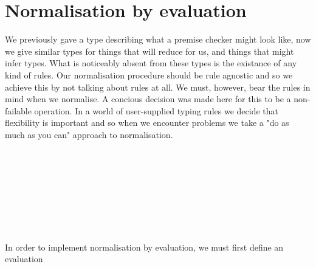 \section{Normalisation by evaluation}
\label{section-normalisation}

We previously gave a type describing what a premise checker might look like, now
we give similar types for things that will reduce for us, and things that might
infer types. What is noticeably absent from these types is the existance of any kind
of rules. Our normalisation procedure should be rule agnostic and so we achieve this
by not talking about rules at all. We must, however, bear the rules in mind when
we normalise. A concious decision was made here for this to be a non-failable
operation. In a world of user-supplied typing rules we decide that flexibility
is important and so when we encounter problems we take a "do as much as you can"
approach to normalisation. 
\begin{code}%
\>[0]%
\>[9]\AgdaSymbol{=}%
\>[13]\AgdaSpace{}%
\AgdaSymbol{\{}\AgdaSymbol{\}}%
\>[40]\<%
\\
%
\>[13]\AgdaSpace{}%
%
\>[40]\<%
\\
%
\>[13]\AgdaSymbol{(}\AgdaSpace{}%
\AgdaSpace{}%
\AgdaSpace{}%
\AgdaSymbol{:}\AgdaSpace{}%
\AgdaSpace{}%
\AgdaSymbol{)}%
\>[40]\<%
\\
%
\>[13]\AgdaSpace{}%
\AgdaSymbol{(}\AgdaSpace{}%
\AgdaSymbol{)}\<%
\\
\>[0]%
\>[9]\AgdaSymbol{=}%
\>[13]\AgdaSpace{}%
\AgdaSymbol{\{}\AgdaSymbol{\}}%
\>[40]\<%
\\
%
\>[13]\AgdaSpace{}%
%
\>[40]\<%
\\
%
\>[13]\AgdaSymbol{(}\AgdaSpace{}%
\AgdaSymbol{:}\AgdaSpace{}%
\AgdaSpace{}%
\AgdaSpace{}%
\AgdaSymbol{)}%
\>[40]\<%
\\
%
\>[13]\AgdaSpace{}%
\AgdaSymbol{(}\AgdaSpace{}%
\AgdaSpace{}%
\AgdaSymbol{)}\<%
\end{code}
In order to implement normalisation by evaluation, we must first define an evaluation
